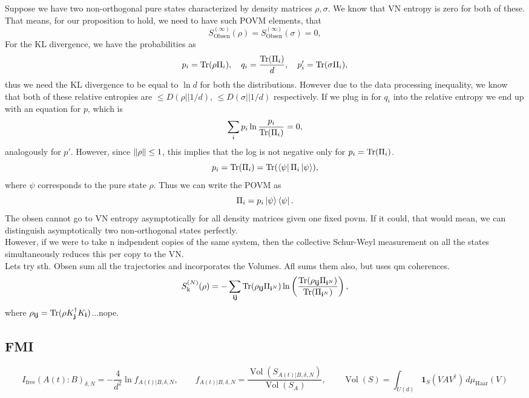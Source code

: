 \documentclass{article}
\begin{document}
 Suppose we have two non-orthogonal pure states characterized by density matrices $\rho, \sigma$. We know that VN entropy is zero for both of these. That means, for our proposition to hold, we need to have such POVM elements, that
\[
    S_{\text{Obsen}}^{(\infty)} (\rho) = S_{\text{Obsen}}^{(\infty)} (\sigma) = 0,
\]
For the KL divergence, we have the probabilities as
\[
    p_i = \text{Tr}(\rho \Pi_i), \quad q_i = \frac{\text{Tr}(\Pi_i)}{d}, \quad p_i' = \text{Tr}(\sigma \Pi_i), 
\]
thus we need the KL divergence to be equal to $\ln d$ for both the distributions. However due to the data processing inequality, we know that both of these relative entropies are $\leq D(\rho||1/d)$, $\leq D(\sigma||1/d)$ respectively. If we plug in for $q_i$ into the relative entropy we end up with an equation for $p$, which is 
\[
    \sum_ip_i\ln\frac{p_i}{\text{Tr}(\Pi_i)} = 0,
\]
analogously for $p'$. However, since $\norm{\rho} \leq 1$, this implies that the log is not negative only for $p_i = \text{Tr}(\Pi_i)$.
\[
    p_i = \text{Tr}(\Pi_i) = \text{Tr}(\bra{\psi}\Pi_i\ket{\psi}),
\]
where $\psi$ corresponds to the pure state $\rho$. Thus we can write the POVM as 
\[
    \Pi_i = p_i \ket{\psi}\bra{\psi}.
\]
The obsen cannot go to VN entropy asymptotically for all density matrices given one fixed povm. If it could, that would mean, we can distinguish asymptotically two non-orthogonal states perfectly. \\
However, if we were to take n indpendent copies of the same system, then the collective Schur-Weyl measurement on all the states simultaneously reduces this per copy to the VN. \\

Lets try sth. Obsen sum all the trajectories and incorporates the Volumes. Afl sums them also, but uses qm coherences. 
\[
    S_{\mathrm{k}}^{(N)}(\rho)=-\sum_{\mathbf{i}\mathbf{j}}\text{Tr}(\rho_{\mathbf{i}\mathbf{j}}\Pi_{\mathbf{i}^N})\ln\left(\frac{\text{Tr}(\rho_{\mathbf{i}\mathbf{j}}\Pi_{\mathbf{i}^N})}{\text{Tr}(\Pi_{\mathbf{i}^N})}\right),
\]
where $\rho_{\mathbf{i}\mathbf{j}} = \text{Tr}(\rho K_\mathbf{j}^\dag K_\mathbf{i})$...nope. 


\subsection{FMI}
\[
    I_{\mathrm{free}}(A(t):B)_{\delta,N}=-\frac{4}{d^2}\ln f_{A(t)|B,\delta,N},\qquad f_{A(t)|B,\delta,N}=\frac{\operatorname{Vol}(S_{A(t)|B,\delta,N})}{\operatorname{Vol}(S_A)},\qquad \operatorname{Vol}(S)=\int_{U(d)}\mathbf{1}_S(VAV^\dagger)\,d\mu_{\mathrm{Haar}}(V)
\]
\end{document}
